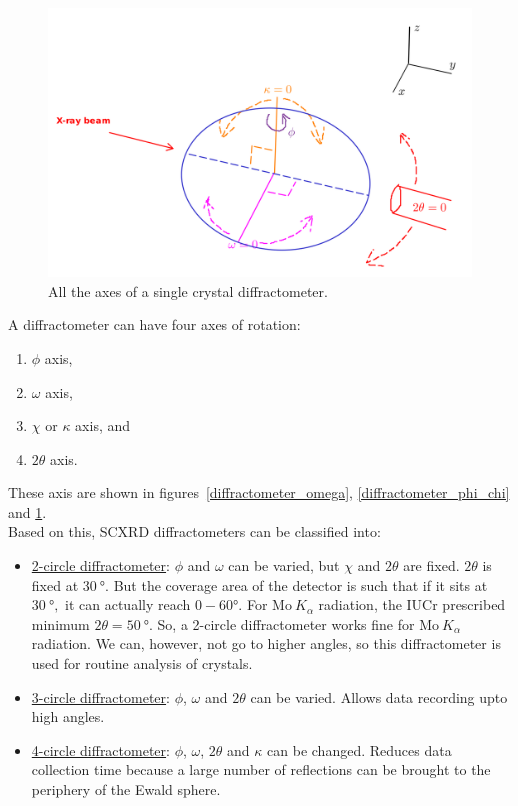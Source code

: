 \begin{figure}
	\centering
	\includegraphics[width=\textwidth]{all_axes.png}
	\caption{\label{diffractometer_all_axes}All the axes of a single crystal diffractometer.}
\end{figure}
 
A diffractometer can have four axes of rotation:%
%	
	\begin{enumerate}%
%	
	    \item $\phi$ axis,
	    
	    \item $\omega$ axis,
	    
	    \item $\chi$ or $\kappa$ axis, and
	    
	    \item $2\theta$ axis.
	    
	\end{enumerate}

These axis are shown in figures~\ref{diffractometer_omega}, \ref{diffractometer_phi_chi} and \ref{diffractometer_all_axes}.\\

Based on this, SCXRD diffractometers can be classified into:%
%	
	\begin{itemize}%
%	
	    \item \ul{2-circle diffractometer}: $\phi$ and $\omega$ can be varied, but $\chi$ and $2\theta$ are fixed. $2\theta$ is fixed at $\SI{30}{\degree}.$ But the coverage area of the detector is such that if it sits at $\SI{30}{\degree},$ it can actually reach $0-60\si{\degree}.$ For $\mathrm{Mo}~K_\alpha$ radiation, the IUCr prescribed minimum $2\theta = \SI{50}{\degree}.$ So, a 2-circle diffractometer works fine for $\mathrm{Mo}~K_\alpha$ radiation. We can, however, not go to higher angles, so this diffractometer is used for routine analysis of crystals.
	    
	    \item \ul{3-circle diffractometer}: $\phi$, $\omega$ and $2\theta$ can be varied. Allows data recording upto high angles.
	    
	    \item \ul{4-circle diffractometer}: $\phi$, $\omega$, $2\theta$ and $\kappa$ can be changed. Reduces data collection time because a large number of reflections can be brought to the periphery of the Ewald sphere.
	    
	\end{itemize}
	
